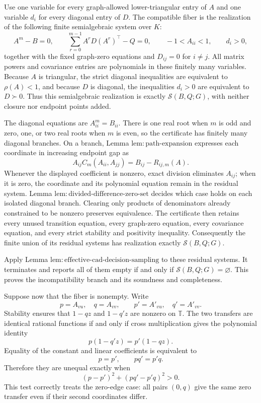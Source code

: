 Use one variable for every graph-allowed lower-triangular entry of \(A\) and one variable \(d_i\) for every diagonal entry of \(D\).  The compatible fiber is the realization of the following finite semialgebraic system over \(K\):
\[
 A^m-B=0,\qquad
 \sum_{r=0}^{m-1}A^rD(A^r)^\top-Q=0,\qquad
 -1<A_{ii}<1,\qquad d_i>0,
\]
together with the fixed graph-zero equations and \(D_{ij}=0\) for \(i\ne j\).  All matrix powers and covariance entries are polynomials in these finitely many variables.  Because \(A\) is triangular, the strict diagonal inequalities are equivalent to \(\rho(A)<1\), and because \(D\) is diagonal, the inequalities \(d_i>0\) are equivalent to \(D\succ0\).  Thus this semialgebraic realization is exactly \(\mathcal S(B,Q;G)\), with neither closure nor endpoint points added.

The diagonal equations are \(A_{ii}^m=B_{ii}\).  There is one real root when \(m\) is odd and zero, one, or two real roots when \(m\) is even, so the certificate has finitely many diagonal branches.  On a branch, Lemma \(\mathrm{lem{:}path\mbox{-}expansion}\) expresses each coordinate in increasing endpoint gap as
\[
 A_{ij}C_m(A_{ii},A_{jj})=B_{ij}-R_{ij,m}(A).
\]
Whenever the displayed coefficient is nonzero, exact division eliminates \(A_{ij}\); when it is zero, the coordinate and its polynomial equation remain in the residual system.  Lemma \(\mathrm{lem{:}divided\mbox{-}difference\mbox{-}zero\mbox{-}set}\) decides which case holds on each isolated diagonal branch.  Clearing only products of denominators already constrained to be nonzero preserves equivalence.  The certificate then retains every unused transition equation, every graph-zero equation, every covariance equation, and every strict stability and positivity inequality.  Consequently the finite union of its residual systems has realization exactly \(\mathcal S(B,Q;G)\).

Apply Lemma \(\mathrm{lem{:}effective\mbox{-}cad\mbox{-}decision\mbox{-}sampling}\) to these residual systems.  It terminates and reports all of them empty if and only if \(\mathcal S(B,Q;G)=\varnothing\).  This proves the incompatibility branch and its soundness and completeness.

Suppose now that the fiber is nonempty.  Write
\[
 p=A_{vu},\quad q=A_{vv},\qquad
 p'=A'_{vu},\quad q'=A'_{vv}.
\]
Stability ensures that \(1-qz\) and \(1-q'z\) are nonzero on \(\mathbb T\).  The two transfers are identical rational functions if and only if cross multiplication gives the polynomial identity
\[
 p(1-q'z)=p'(1-qz).
\]
Equality of the constant and linear coefficients is equivalent to
\[
 p=p',\qquad pq'=p'q.
\]
Therefore they are unequal exactly when
\[
 (p-p')^2+(pq'-p'q)^2>0.
\]
This test correctly treats the zero-edge case: all pairs \((0,q)\) give the same zero transfer even if their second coordinates differ.

